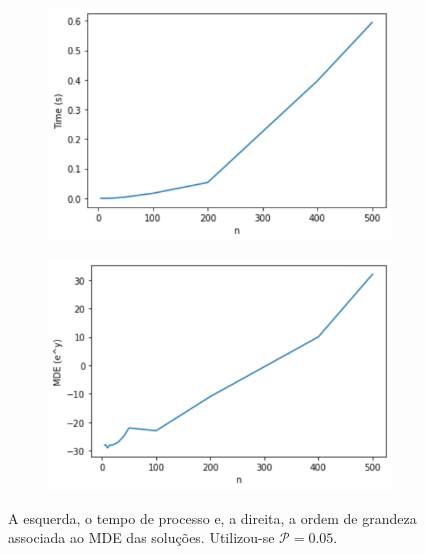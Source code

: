 \documentclass[a4paper,12pt]{report}
\begin{document}
	\begin{figure}[H]
		\begin{center}
			\begin{minipage}{0.45 \linewidth}
				\begin{figure}[H]
					\begin{center}
						\includegraphics[width=1\linewidth]{figures/timePro2.png}
					\end{center}
				\end{figure}
			\end{minipage}
			\hspace{0.1cm}
			\begin{minipage}{0.45 \linewidth}
				
				\begin{figure}[H]
					\begin{center}
						\includegraphics[width=1\linewidth]{figures/mdeTriPro2.png}
					\end{center}
					\label{fig:mdeTri}
				\end{figure}
			\end{minipage}
		\end{center}
		\caption{A esquerda, o tempo de processo e, a direita, a ordem de grandeza associada ao MDE das soluções. Utilizou-se $\mathcal{P} = 0.05$.}
		\label{fig:triPri3}
	\end{figure}
	
\end{document}
